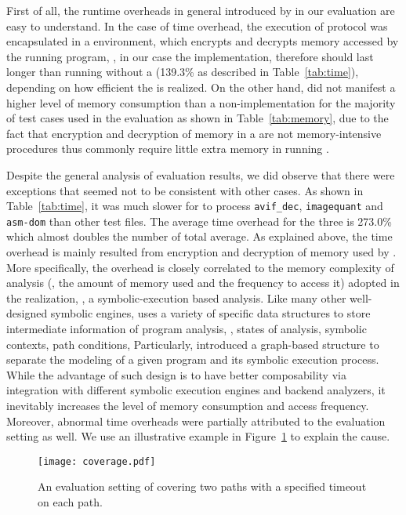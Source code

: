 First of all, the runtime overheads in general introduced by \tool in our evaluation are easy to understand. 
In the case of time overhead, the execution of \tcpa protocol was encapsulated in a \tee environment, 
which encrypts and decrypts memory accessed by the running program, \ie, in our case the \tool implementation, 
therefore should last longer than running \tcpa without a \tee (139.3\% as described in Table~\ref{tab:time}), 
depending on how efficient the \tee is realized. 
On the other hand, \tool did not manifest a higher level of memory consumption than a non-\tee implementation 
for the majority of test cases used in the evaluation as shown in Table~\ref{tab:memory}, due to the fact that 
encryption and decryption of memory in a \tee are not memory-intensive procedures thus commonly require little 
extra memory in running \tcpa.

Despite the general analysis of evaluation results, we did observe that there were exceptions that seemed not to
be consistent with other cases. As shown in Table~\ref{tab:time}, it was much slower for \tool to process 
\texttt{avif\_dec}, \texttt{imagequant} and \texttt{asm-dom} than other test files. The average time overhead for 
the three is 273.0\% which almost doubles the number of total average. As explained above, the time overhead is 
mainly resulted from encryption and decryption of memory used by \tool. More specifically, the overhead is closely 
correlated to the memory complexity of analysis (\eg, the amount of memory used and the frequency to access it) 
adopted in the \tcpa realization, \ie, a symbolic-execution based analysis. Like many other well-designed symbolic 
engines, \tool uses a variety of specific data structures to store intermediate information of program analysis, 
\eg, states of analysis, symbolic contexts, path conditions, \etc Particularly, \tool introduced a graph-based structure to 
separate the modeling of a given program and its symbolic execution process. While the advantage of such design is 
to have better composability via integration with different symbolic execution engines and backend analyzers, it 
inevitably increases the level of memory consumption and access frequency. Moreover, abnormal time overheads were 
partially attributed to the evaluation setting as well. We use an illustrative example in Figure~\ref{fig:setting} 
to explain the cause. 

\begin{figure}[h]
\centering
\texttt{[image: coverage.pdf]}
\caption{\label{fig:setting}An evaluation setting of covering two paths with a specified timeout on each path.}	
\end{figure}

